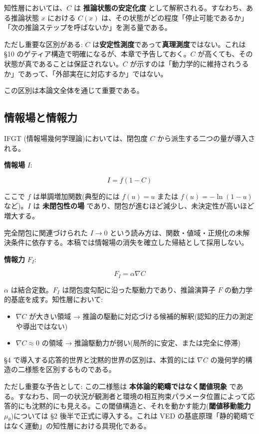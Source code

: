 知性層においては、$C$ は \textbf{推論状態の安定化度} として解釈される。すなわち、ある推論状態 $x$ における $C(x)$ は、その状態がどの程度「停止可能であるか」「次の推論ステップを呼ばないか」を測る量である。

ただし重要な区別がある: $C$ は\textbf{安定性測度}であって\textbf{真理測度}ではない。これは \S{}10 のゲティア構造で明確になるが、本章で予告しておく。$C$ が高くても、その状態が真であることは保証されない。$C$ が示すのは「動力学的に維持されうるか」であって、「外部実在に対応するか」ではない。

この区別は本論文全体を通じて重要である。

\bigskip


\subsection{情報場と情報力}


IFGT (情報場幾何学理論)においては、閉包度 $C$ から派生する二つの量が導入される。

\textbf{情報場} $I$:

\[
I = f(1 - C)
\]

ここで $f$ は単調増加関数(典型的には $f(u) = u$ または $f(u) = -\ln(1-u)$ など)。$I$ は \textbf{未閉包性の場} であり、閉包が進むほど減少し、未決定性が高いほど増大する。

完全閉包に関連づけられた $I \to 0$ という読み方は、関数・値域・正規化の未解決条件に依存する。本稿では情報場の消失を確立した帰結として採用しない。

\textbf{情報力} $F_I$:

\[
F_I = \alpha \nabla C
\]

$\alpha$ は結合定数。$F_I$ は閉包度勾配に沿った駆動力であり、推論演算子 $F$ の動力学的基底を成す。知性層において:

\begin{itemize}
\item $\nabla C$ が大きい領域 → 推論の駆動に対応づける候補的解釈(認知的圧力の測定や導出ではない)
\item $\nabla C \approx 0$ の領域 → 推論駆動力が弱い(局所的に安定、または完全に停滞)
\end{itemize}


\S{}4 で導入する応答的世界と沈黙的世界の区別は、本質的には $\nabla C$ の幾何学的構造の二様態を区別するものである。

ただし重要な予告として: この二様態は \textbf{本体論的範疇ではなく閾値現象} である。すなわち、同一の状況が観測者と環境の相互拘束パラメータ位置によって応答的にも沈黙的にも見える。この閾値構造と、それを動かす能力(\textbf{閾値移動能力} $\mu_\theta$)については \S{}2 後半で正式に導入する。これは VED の基底原理「静的範疇ではなく運動」の知性層における具現化である。

